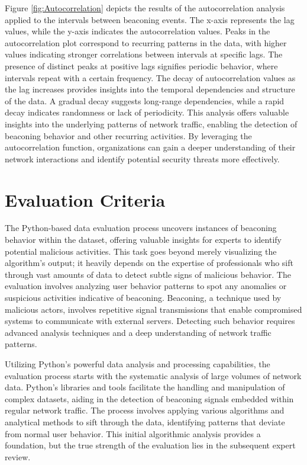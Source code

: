 Figure \ref{fig:Autocorrelation} depicts the results of the autocorrelation analysis applied to the intervals between beaconing events. The x-axis represents the lag values, while the y-axis indicates the autocorrelation values. Peaks in the autocorrelation plot correspond to recurring patterns in the data, with higher values indicating stronger correlations between intervals at specific lags. The presence of distinct peaks at positive lags signifies periodic behavior, where intervals repeat with a certain frequency. The decay of autocorrelation values as the lag increases provides insights into the temporal dependencies and structure of the data. A gradual decay suggests long-range dependencies, while a rapid decay indicates randomness or lack of periodicity. This analysis offers valuable insights into the underlying patterns of network traffic, enabling the detection of beaconing behavior and other recurring activities. By leveraging the autocorrelation function, organizations can gain a deeper understanding of their network interactions and identify potential security threats more effectively.

\section{Evaluation Criteria}
The Python-based data evaluation process uncovers instances of beaconing behavior within the dataset, offering valuable insights for experts to identify potential malicious activities. This task goes beyond merely visualizing the algorithm's output; it heavily depends on the expertise of professionals who sift through vast amounts of data to detect subtle signs of malicious behavior. The evaluation involves analyzing user behavior patterns to spot any anomalies or suspicious activities indicative of beaconing. Beaconing, a technique used by malicious actors, involves repetitive signal transmissions that enable compromised systems to communicate with external servers. Detecting such behavior requires advanced analysis techniques and a deep understanding of network traffic patterns.

Utilizing Python's powerful data analysis and processing capabilities, the evaluation process starts with the systematic analysis of large volumes of network data. Python's libraries and tools facilitate the handling and manipulation of complex datasets, aiding in the detection of beaconing signals embedded within regular network traffic. The process involves applying various algorithms and analytical methods to sift through the data, identifying patterns that deviate from normal user behavior. This initial algorithmic analysis provides a foundation, but the true strength of the evaluation lies in the subsequent expert review.

